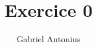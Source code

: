 \documentclass[12pt,solution=true]{uqtrassignment}
\title{Exercice 0}
\author{Gabriel Antonius}
\begin{document}
\maketitle

\begin{problem}{}

\begin{solution}
\end{solution}
\end{problem}
\end{document}
